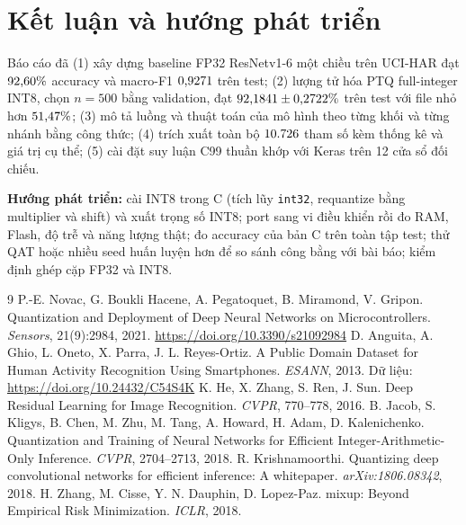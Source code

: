 \documentclass[12pt,a4paper]{article}
\newcommand{\code}[1]{\texttt{#1}}
\begin{document}
\section{Kết luận và hướng phát triển}
Báo cáo đã (1) xây dựng baseline FP32 ResNetv1-6 một chiều trên UCI-HAR đạt $\mbox{92,60}\%$ accuracy và macro-F1 $\mbox{0,9271}$ trên test; (2) lượng tử hóa PTQ full-integer INT8, chọn $n=500$ bằng validation, đạt $\mbox{92,1841}\pm\mbox{0,2722}\%$ trên test với file nhỏ hơn $\mbox{51,47}\%$; (3) mô tả luồng và thuật toán của mô hình theo từng khối và từng nhánh bằng công thức; (4) trích xuất toàn bộ $\mbox{10.726}$ tham số kèm thống kê và giá trị cụ thể; (5) cài đặt suy luận C99 thuần khớp với Keras trên 12 cửa sổ đối chiếu.

\textbf{Hướng phát triển:} cài INT8 trong C (tích lũy \code{int32}, requantize bằng multiplier và shift) và xuất trọng số INT8; port sang vi điều khiển rồi đo RAM, Flash, độ trễ và năng lượng thật; đo accuracy của bản C trên toàn tập test; thử QAT hoặc nhiều seed huấn luyện hơn để so sánh công bằng với bài báo; kiểm định ghép cặp FP32 và INT8.

\begin{thebibliography}{9}
 P.-E. Novac, G. Boukli Hacene, A. Pegatoquet, B. Miramond, V. Gripon. Quantization and Deployment of Deep Neural Networks on Microcontrollers. \emph{Sensors}, 21(9):2984, 2021. \url{https://doi.org/10.3390/s21092984}
 D. Anguita, A. Ghio, L. Oneto, X. Parra, J. L. Reyes-Ortiz. A Public Domain Dataset for Human Activity Recognition Using Smartphones. \emph{ESANN}, 2013. Dữ liệu: \url{https://doi.org/10.24432/C54S4K}
 K. He, X. Zhang, S. Ren, J. Sun. Deep Residual Learning for Image Recognition. \emph{CVPR}, 770--778, 2016.
 B. Jacob, S. Kligys, B. Chen, M. Zhu, M. Tang, A. Howard, H. Adam, D. Kalenichenko. Quantization and Training of Neural Networks for Efficient Integer-Arithmetic-Only Inference. \emph{CVPR}, 2704--2713, 2018.
 R. Krishnamoorthi. Quantizing deep convolutional networks for efficient inference: A whitepaper. \emph{arXiv:1806.08342}, 2018.
 H. Zhang, M. Cisse, Y. N. Dauphin, D. Lopez-Paz. mixup: Beyond Empirical Risk Minimization. \emph{ICLR}, 2018.
\end{thebibliography}

\appendix
\end{document}
